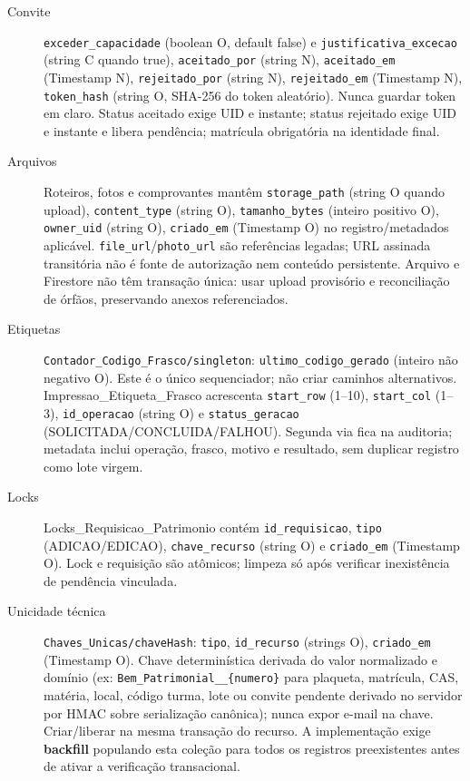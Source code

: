 \begin{description}
\item[Convite] \texttt{exceder\_capacidade} (boolean O, default false) e \texttt{justificativa\_excecao} (string C quando true), \texttt{aceitado\_por} (string N), \texttt{aceitado\_em} (Timestamp N), \texttt{rejeitado\_por} (string N), \texttt{rejeitado\_em} (Timestamp N), \texttt{token\_hash} (string O, SHA-256 do token aleatório). Nunca guardar token em claro. Status aceitado exige UID e instante; status rejeitado exige UID e instante e libera pendência; matrícula obrigatória na identidade final.
\item[Arquivos] Roteiros, fotos e comprovantes mantêm \texttt{storage\_path} (string O quando upload), \texttt{content\_type} (string O), \texttt{tamanho\_bytes} (inteiro positivo O), \texttt{owner\_uid} (string O), \texttt{criado\_em} (Timestamp O) no registro/metadados aplicável. \texttt{file\_url}/\texttt{photo\_url} são referências legadas; URL assinada transitória não é fonte de autorização nem conteúdo persistente. Arquivo e Firestore não têm transação única: usar upload provisório e reconciliação de órfãos, preservando anexos referenciados.
\item[Etiquetas] \texttt{Contador\_Codigo\_Frasco/singleton}: \texttt{ultimo\_codigo\_gerado} (inteiro não negativo O). Este é o único sequenciador; não criar caminhos alternativos. Impressao\_Etiqueta\_Frasco acrescenta \texttt{start\_row} (1--10), \texttt{start\_col} (1--3), \texttt{id\_operacao} (string O) e \texttt{status\_geracao} (SOLICITADA/CONCLUIDA/FALHOU). Segunda via fica na auditoria; metadata inclui operação, frasco, motivo e resultado, sem duplicar registro como lote virgem.
\item[Locks] Locks\_Requisicao\_Patrimonio contém \texttt{id\_requisicao}, \texttt{tipo} (ADICAO/EDICAO), \texttt{chave\_recurso} (string O) e \texttt{criado\_em} (Timestamp O). Lock e requisição são atômicos; limpeza só após verificar inexistência de pendência vinculada.
\item[Unicidade técnica] \texttt{Chaves\_Unicas/chaveHash}: \texttt{tipo}, \texttt{id\_recurso} (strings O), \texttt{criado\_em} (Timestamp O). Chave determinística derivada do valor normalizado e domínio (ex: \texttt{Bem\_Patrimonial\_\_\{numero\}} para plaqueta, matrícula, CAS, matéria, local, código turma, lote ou convite pendente derivado no servidor por HMAC sobre serialização canônica); nunca expor e-mail na chave. Criar/liberar na mesma transação do recurso. A implementação exige \textbf{backfill} populando esta coleção para todos os registros preexistentes antes de ativar a verificação transacional.

\end{description}

